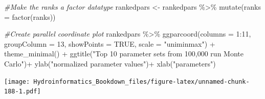 \documentclass[
]{book}
\newenvironment{Shaded}{\begin{snugshade}}{\end{snugshade}}
\newcommand{\AttributeTok}[1]{\textcolor[rgb]{0.77,0.63,0.00}{#1}}
\newcommand{\CommentTok}[1]{\textcolor[rgb]{0.56,0.35,0.01}{\textit{#1}}}
\newcommand{\ConstantTok}[1]{\textcolor[rgb]{0.00,0.00,0.00}{#1}}
\newcommand{\DecValTok}[1]{\textcolor[rgb]{0.00,0.00,0.81}{#1}}
\newcommand{\FunctionTok}[1]{\textcolor[rgb]{0.00,0.00,0.00}{#1}}
\newcommand{\NormalTok}[1]{#1}
\newcommand{\OtherTok}[1]{\textcolor[rgb]{0.56,0.35,0.01}{#1}}
\newcommand{\SpecialCharTok}[1]{\textcolor[rgb]{0.00,0.00,0.00}{#1}}
\newcommand{\StringTok}[1]{\textcolor[rgb]{0.31,0.60,0.02}{#1}}
\begin{document}
\begin{Shaded}
\begin{Highlighting}[]
\CommentTok{\#Make the ranks a factor datatype}
\NormalTok{rankedpars }\OtherTok{\textless{}{-}}\NormalTok{ rankedpars }\SpecialCharTok{\%\textgreater{}\%} \FunctionTok{mutate}\NormalTok{(}\AttributeTok{ranks =} \FunctionTok{factor}\NormalTok{(ranks))}

\CommentTok{\#Create parallel coordinate plot}
\NormalTok{rankedpars }\SpecialCharTok{\%\textgreater{}\%} \FunctionTok{ggparcoord}\NormalTok{(}\AttributeTok{columns =} \DecValTok{1}\SpecialCharTok{:}\DecValTok{11}\NormalTok{, }
              \AttributeTok{groupColumn =} \DecValTok{13}\NormalTok{,}
              \AttributeTok{showPoints =} \ConstantTok{TRUE}\NormalTok{,}
              \AttributeTok{scale =} \StringTok{"uniminmax"}\NormalTok{) }\SpecialCharTok{+}
              \FunctionTok{theme\_minimal}\NormalTok{() }\SpecialCharTok{+}
              \FunctionTok{ggtitle}\NormalTok{(}\StringTok{"Top 10 parameter sets from 100,000 run Monte Carlo"}\NormalTok{)}\SpecialCharTok{+}
              \FunctionTok{ylab}\NormalTok{(}\StringTok{"normalized parameter values"}\NormalTok{)}\SpecialCharTok{+}
              \FunctionTok{xlab}\NormalTok{(}\StringTok{"parameters"}\NormalTok{)}
\end{Highlighting}
\end{Shaded}

\texttt{[image: Hydroinformatics\_Bookdown\_files/figure-latex/unnamed-chunk-188-1.pdf]}

  
\end{document}

